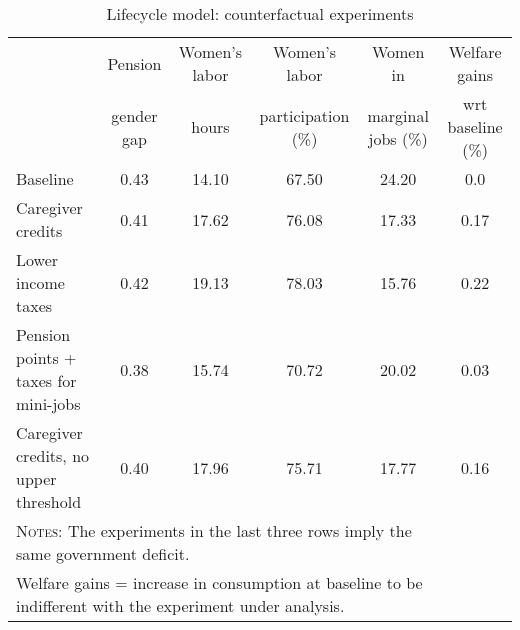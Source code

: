 \begin{table}[htbp]\caption{Lifecycle model: counterfactual experiments}\label{table:experiments}\centering\footnotesize\begin{tabular}{lccccc} \toprule & Pension & Women's labor & Women's labor & Women in &  Welfare gains  \\&gender gap &hours &  participation  (\%) & marginal jobs (\%)  & wrt baseline (\%)  \\\midrule    Baseline                                   &0.43&14.10&67.50&24.20& 0.0\\ Caregiver credits                          &0.41&17.62&76.08&17.33&0.17\\ Lower income taxes                         &0.42&19.13&78.03&15.76&0.22\\ Pension points + taxes for mini-jobs&0.38&15.74&70.72&20.02&0.03\\ Caregiver credits, no upper threshold      &0.40&17.96&75.71&17.77&0.16\\ \bottomrule\multicolumn{5}{l}{\textsc{Notes:} The experiments in the last three rows imply the same government deficit.}\\\multicolumn{5}{l}{Welfare gains = increase in consumption at baseline to be indifferent with the experiment under analysis. }\end{tabular}
      \end{table}